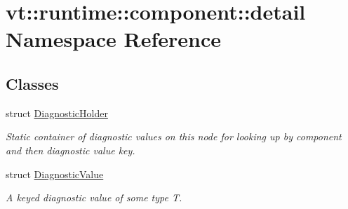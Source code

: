 \hypertarget{namespacevt_1_1runtime_1_1component_1_1detail}{}\section{vt\+:\+:runtime\+:\+:component\+:\+:detail Namespace Reference}
\label{namespacevt_1_1runtime_1_1component_1_1detail}
\subsection*{Classes}
\begin{DoxyCompactItemize}
\item 
struct \hyperlink{structvt_1_1runtime_1_1component_1_1detail_1_1_diagnostic_holder}{Diagnostic\+Holder}
\begin{DoxyCompactList}\small\item\em Static container of diagnostic values on this node for looking up by component and then diagnostic value key. \end{DoxyCompactList}\item 
struct \hyperlink{structvt_1_1runtime_1_1component_1_1detail_1_1_diagnostic_value}{Diagnostic\+Value}
\begin{DoxyCompactList}\small\item\em A keyed diagnostic value of some type {\ttfamily T}. \end{DoxyCompactList}\end{DoxyCompactItemize}
